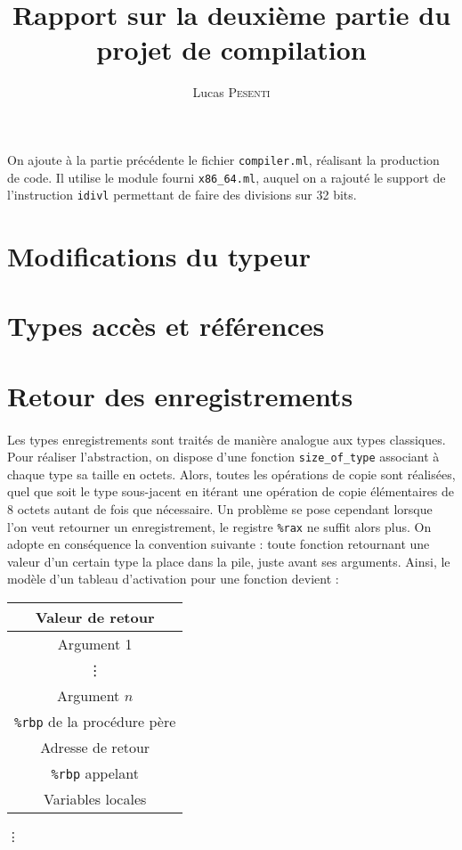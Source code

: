 \documentclass[a4paper,12pt]{article}
\title{Rapport sur la deuxième partie du projet de compilation}
\author{Lucas \textsc{Pesenti}}
\date{}
\begin{document}
\maketitle
\paragraph*{}
On ajoute à la partie précédente le fichier \texttt{compiler.ml}, réalisant la production de code. Il utilise le module fourni \texttt{x86\_64.ml}, auquel on
a rajouté le support de l'instruction \texttt{idivl} permettant de faire des divisions sur 32 bits.

\section{Modifications du typeur}

\section{Types accès et références}

\section{Retour des enregistrements}

\paragraph*{}
Les types enregistrements sont traités de manière analogue aux types classiques. Pour réaliser l'abstraction, on dispose d'une fonction \texttt{size\_of\_type}
associant à chaque type sa taille en octets. Alors, toutes les opérations de copie sont réalisées, quel que soit le type sous-jacent en itérant une opération
de copie élémentaires de 8 octets autant de fois que nécessaire. Un problème se pose cependant lorsque l'on veut retourner un enregistrement, le registre
\texttt{\%rax} ne suffit alors plus. On adopte en conséquence la convention suivante : toute fonction retournant une valeur d'un certain type la place dans la pile,
juste avant ses arguments. Ainsi, le modèle d'un tableau d'activation pour une fonction devient :

\begin{center}
\begin{tabular}{|c|}
  \hline
  Valeur de retour\\
  \hline
  Argument 1\\
  \hline
  \vdots\\
  \hline
  Argument $n$\\
  \hline
  \texttt{\%rbp} de la procédure père\\
  \hline
  Adresse de retour\\ 
  \hline
  \texttt{\%rbp} appelant\\
  \hline
  Variables locales\\
  \hline
\end{tabular}

\vdots
\end{center}
\end{document}

